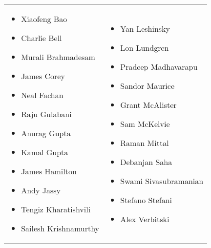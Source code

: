 \begin{tabular}{l l}
\begin{minipage} [t] {0.38\textwidth} 
\begin{itemize}
\small
\setlength\itemsep{-3pt}
\item Xiaofeng Bao
\item Charlie Bell
\item Murali Brahmadesam
\item James Corey
\item Neal Fachan
\item Raju Gulabani
\item Anurag Gupta
\item Kamal Gupta
\item James Hamilton
\item Andy Jassy
\item Tengiz Kharatishvili
\item Sailesh Krishnamurthy

\end{itemize}
\end{minipage}
  & 
\begin{minipage} [t] {0.45\textwidth} 
\begin{itemize}
\small
\setlength\itemsep{-3pt}
\item Yan Leshinsky
\item Lon Lundgren
\item Pradeep Madhavarapu
\item Sandor Maurice
\item Grant McAlister
\item Sam McKelvie
\item Raman Mittal
\item Debanjan Saha
\item Swami Sivasubramanian
\item Stefano Stefani
\item Alex Verbitski
\end{itemize}
\end{minipage}
\end{tabular}







